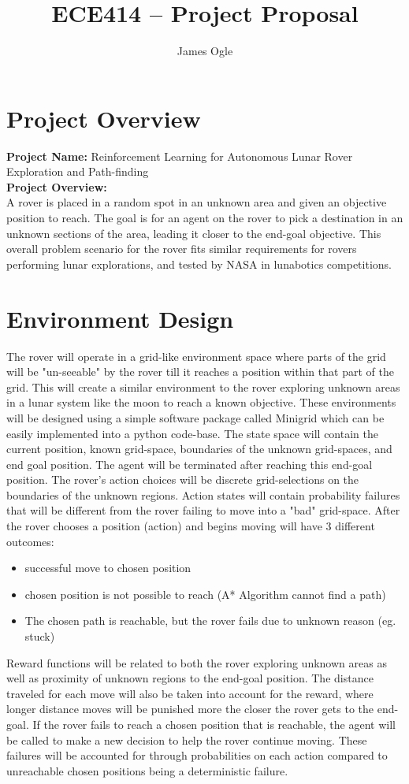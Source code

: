 \documentclass[12pt]{article}
\author{James Ogle}
\title{ECE414 -- Project Proposal}
\begin{document}
\maketitle
{}
\section*{Project Overview}
\textbf{Project Name:} Reinforcement Learning for Autonomous Lunar Rover Exploration and Path-finding\\
\noindent\textbf{Project Overview:}\\
A rover is placed in a random spot in an unknown area and given an objective position to reach.
The goal is for an agent on the rover to pick a destination in an unknown sections of the area, leading it closer to the end-goal objective.
This overall problem scenario for the rover fits similar requirements for rovers performing lunar explorations, and tested by NASA in lunabotics competitions.

\section*{Environment Design}
The rover will operate in a grid-like environment space where parts of the grid will be "un-seeable" by the rover till it reaches a position within that part of the grid.
This will create a similar environment to the rover exploring unknown areas in a lunar system like the moon to reach a known objective.
These environments will be designed using a simple software package called Minigrid which can be easily implemented into a python code-base.
The state space will contain the current position, known grid-space, boundaries of the unknown grid-spaces, and end goal position.
The agent will be terminated after reaching this end-goal position.
The rover's action choices will be discrete grid-selections on the boundaries of the unknown regions.
Action states will contain probability failures that will be different from the rover failing to move into a "bad" grid-space.
After the rover chooses a position (action) and begins moving will have 3 different outcomes:
\begin{itemize}
    \item successful move to chosen position
    \item chosen position is not possible to reach (A* Algorithm cannot find a path)
    \item The chosen path is reachable, but the rover fails due to unknown reason (eg. stuck)
\end{itemize}
Reward functions will be related to both the rover exploring unknown areas as well as proximity of unknown regions to the end-goal position.
The distance traveled for each move will also be taken into account for the reward, where longer distance moves will be punished more the closer the rover gets to the end-goal.
If the rover fails to reach a chosen position that is reachable, the agent will be called to make a new decision to help the rover continue moving. 
These failures will be accounted for through probabilities on each action compared to unreachable chosen positions being a deterministic failure.
\end{document}
